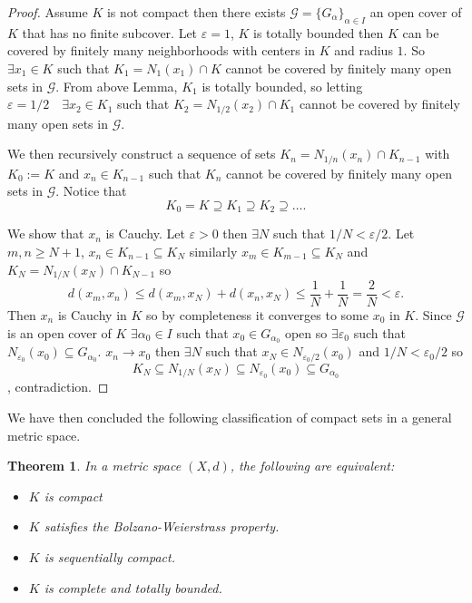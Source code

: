 \documentclass[11pt,openany]{book}
\theoremstyle{plain}
\newtheorem{theorem}{Theorem}[chapter]
\theoremstyle{definition}
\theoremstyle{remark}
\newcommand{\eps}{\varepsilon}
\begin{document}
\begin{proof}
    Assume $K$ is not compact then there exists $\mathcal{G} = \{G_{\alpha}\}_{\alpha \in I}$ an open cover of $K$ that has no finite subcover. Let $\eps = 1$, $K$ is totally bounded then $K$ can be covered by finitely many neighborhoods with centers in $K$ and radius $1$. So $\exists x_1 \in K$ such that $K_1 = N_1(x_1) \cap K$ cannot be covered by finitely many open sets in $\mathcal{G}$. From above Lemma, $K_1$ is totally bounded, so letting $\eps = 1/2 \quad \exists x_2 \in K_1$ such that $K_2 = N_{1/2}(x_2)\cap K_1$ cannot be covered by finitely many open sets in $\mathcal{G}$. 
    
    We then recursively construct a sequence of sets $K_n = N_{1/n}(x_n) \cap K_{n-1}$ with $K_0:=K$ and $x_n \in K_{n-1}$ such that $K_n$ cannot be covered by finitely many open sets in $\mathcal G$. 
    Notice that
    $$K_0 = K \supseteq K_1 \supseteq K_2 \supseteq \dots.$$ 
    
    We show that $x_n$ is Cauchy. Let $\eps >0$ then $\exists N$ such that $1/N < \eps/2$. Let $m,n \ge N+1$, $x_n \in K_{n-1} \subseteq K_N$ similarly $x_m \in K_{m-1} \subseteq K_N$ and $K_N = N_{1/N}(x_N) \cap K_{N-1}$ so
    \[d(x_m,x_n) \le d(x_m,x_N) +d(x_n,x_N) \le \frac{1}{N}+\frac{1}{N} = \frac{2}{N} < \eps.\]
    Then $x_n$ is Cauchy in $K$ so by completeness it converges to some $x_0$ in $K$. Since $\mathcal{G}$ is an open cover of $K$ $\exists \alpha_0 \in I$ such that $x_0 \in G_{\alpha_0}$ open so $\exists \eps_0$ such that $N_{\eps_0}(x_0) \subseteq G_{\alpha_0}$. $x_n \to  x_0$ then $\exists N$ such that $x_N \in N_{\eps_0/2}(x_0)$ and $1/N < \eps_0/2$ so \[ K_N \subseteq N_{1/N}(x_N) \subseteq N_{\eps_0}(x_0) \subseteq G_{\alpha_0}\], contradiction.
\end{proof}

We have then concluded the following classification of compact sets in a general metric space.

\begin{theorem}
In a metric space $(X,d)$, the following are equivalent:
\begin{itemize}
    \item $K$ is compact
    \item $K$ satisfies the Bolzano-Weierstrass property.
    \item $K$ is sequentially compact.
    \item $K$ is complete and totally bounded.
\end{itemize}
\end{theorem}
\end{document}
